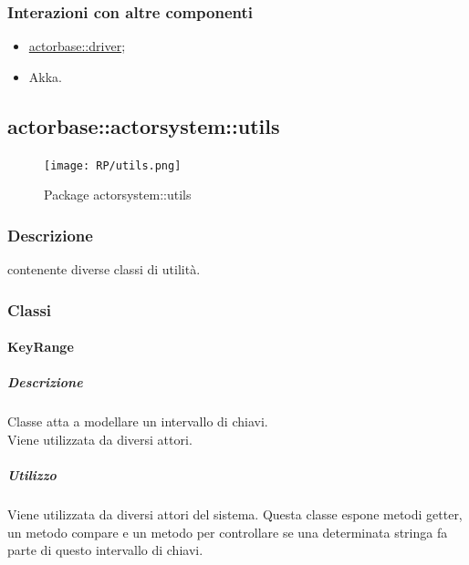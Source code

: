 \documentclass{scalatekids-article}
\begin{document}
\subsubsection{Interazioni con altre componenti}

\begin{itemize}
\item \hyperref[sec:actorbase::driver]{actorbase::driver};
\item Akka.
\end{itemize}


\subsection{actorbase::actorsystem::utils}
\label{sec:actorbase::actorsystem::utils}

\begin{figure}[H] %
  \begin{center}
    \texttt{[image: RP/utils.png]}
    \caption{Package actorsystem::utils}
  \end{center}
\end{figure}

\subsubsection{Descrizione}
 contenente diverse classi di utilità.

\subsubsection{Classi}


\paragraph{KeyRange}
\label{sec:actorbase::actorsystem::utils::KeyRange}

\subparagraph{Descrizione}
Classe atta a modellare un intervallo di chiavi.\\Viene utilizzata da diversi
attori.

\subparagraph{Utilizzo}
Viene utilizzata da diversi attori del sistema. Questa classe espone metodi
getter, un metodo compare e un metodo per controllare se una determinata
stringa fa parte di questo intervallo di chiavi.
\end{document}
